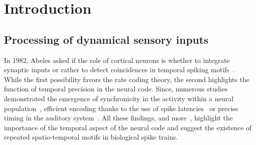\documentclass[default]{sn-jnl}%
\theoremstyle{thmstyleone}%
\theoremstyle{thmstyletwo}%
\theoremstyle{thmstylethree}%
\begin{document}
\title[\ShortTitle]{\Title}
%

\author*{ }

\author{ }


%
%
%
%


\abstract{
\Abstract
}


%
%
%
\keywords{\Keywords}
%
\maketitle
\section{Introduction}
\label{sec:intro}
%
\subsection{Processing of dynamical sensory inputs}
In 1982, Abeles asked if the role of cortical neurons is whether to integrate synaptic inputs or rather to detect coincidences in temporal spiking motifs~\citep{abeles_role_1982}. While the first possibility favors the rate coding theory, the second highlights the function of temporal precision in the neural code. Since, numerous studies demonstrated the emergence of synchronicity in the activity within a neural population~\citep{riehle_spike_1997, davis_spontaneous_2021}, efficient encoding thanks to the use of spike latencies~\citep{perrinet_coding_2004, gollisch_rapid_2008} or precise timing in the auditory system~\citep{deweese_binary_2002, carr_circuit_1990}. All these findings, and more~\citep{bohte_evidence_2004}, highlight the importance of the temporal aspect of the neural code and suggest the existence of repeated spatio-temporal motifs in biological spike trains.
\end{document}
